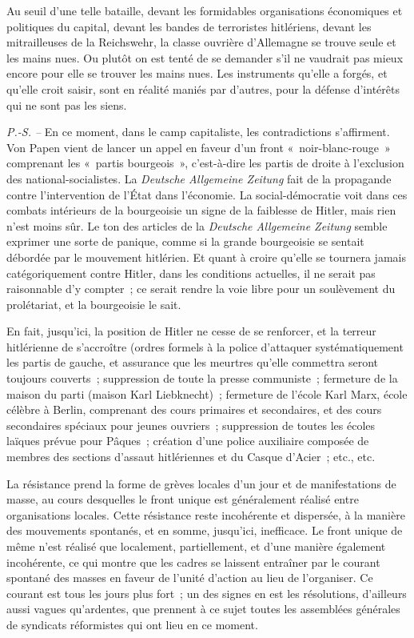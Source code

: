 \documentclass[french,twoside]{book} %
\begin{document}
Au seuil d'une telle bataille, devant les formidables organisations écono­miques et politiques du capital, devant les bandes de terroristes hitlériens, devant les mitrailleuses de la Reichswehr, la classe ouvrière d'Allemagne se trouve seule et les mains nues. Ou plutôt on est tenté de se demander s'il ne vaudrait pas mieux encore pour elle se trouver les mains nues. Les instruments qu'elle a forgés, et qu'elle croit saisir, sont en réalité maniés par d'autres, pour la défense d'intérêts qui ne sont pas les siens.\par
{\itshape P.-S. –} En ce moment, dans le camp capitaliste, les contradictions s'affir­ment. Von Papen vient de lancer un appel en faveur d'un front « noir-blanc-rouge » comprenant les « partis bourgeois », c'est-à-dire les partis de droite à l'exclusion des national-socialistes. La {\itshape Deutsche Allgemeine Zeitung} fait de la propagande contre l'intervention de l'État dans l'économie. La social-démo­cratie voit dans ces combats intérieurs de la bourgeoisie un signe de la fai­blesse de Hitler, mais rien n'est moins sûr. Le ton des articles de la {\itshape Deutsche Allgemeine Zeitung} semble exprimer une sorte de panique, comme si la grande bourgeoisie se sentait débordée par le mouvement hitlérien. Et quant à croire qu'elle se tournera jamais catégoriquement contre Hitler, dans les conditions actuelles, il ne serait pas raisonnable d'y compter ; ce serait rendre la voie libre pour un soulèvement du prolétariat, et la bourgeoisie le sait.\par
En fait, jusqu'ici, la position de Hitler ne cesse de se renforcer, et la terreur hitlérienne de s'accroître (ordres formels à la police d'attaquer systéma­tiquement les partis de gauche, et assurance que les meurtres qu'elle commet­tra seront toujours couverts ; suppression de toute la presse communiste ; fermeture de la maison du parti (maison Karl Liebknecht) ; fermeture de l'école Karl Marx, école célèbre à Berlin, comprenant des cours primaires et secondaires, et des cours secondaires spéciaux pour jeunes ouvriers ; suppres­sion de toutes les écoles laïques prévue pour Pâques ; création d'une police auxiliaire composée de membres des sections d'assaut hitlériennes et du Casque d'Acier ; etc., etc.\par
La résistance prend la forme de grèves locales d'un jour et de manifesta­tions de masse, au cours desquelles le front unique est généralement réalisé entre organisations locales. Cette résistance reste incohérente et dispersée, à la manière des mouvements spontanés, et en somme, jusqu'ici, inefficace. Le front unique de même n'est réalisé que localement, partiellement, et d'une manière également incohérente, ce qui montre que les cadres se laissent entraîner par le courant spontané des masses en faveur de l'unité d'action au lieu de l'organiser. Ce courant est tous les jours plus fort ; un des signes en est les résolutions, d'ailleurs aussi vagues qu'ardentes, que prennent à ce sujet toutes les assemblées générales de syndicats réformistes qui ont lieu en ce moment.\par
\end{document}
